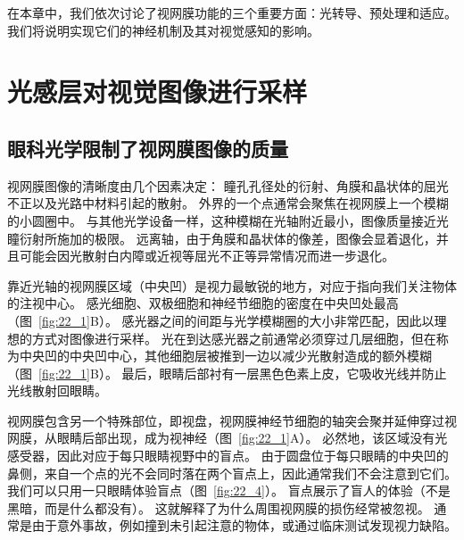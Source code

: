 在本章中，我们依次讨论了视网膜功能的三个重要方面：光转导、预处理和适应。
我们将说明实现它们的神经机制及其对视觉感知的影响。



\section{光感层对视觉图像进行采样}

\subsection{眼科光学限制了视网膜图像的质量}

视网膜图像的清晰度由几个因素决定：
瞳孔孔径处的衍射、角膜和晶状体的屈光不正以及光路中材料引起的散射。
外界的一个点通常会聚焦在视网膜上一个模糊的小圆圈中。
与其他光学设备一样，这种模糊在光轴附近最小，图像质量接近光瞳衍射所施加的极限。
远离轴，由于角膜和晶状体的像差，图像会显着退化，并且可能会因光散射白内障或近视等屈光不正等异常情况而进一步退化。


靠近光轴的视网膜区域（中央凹）是视力最敏锐的地方，对应于指向我们关注物体的注视中心。
感光细胞、双极细胞和神经节细胞的密度在中央凹处最高（图~\ref{fig:22_1}B）。
感光器之间的间距与光学模糊圈的大小非常匹配，因此以理想的方式对图像进行采样。
光在到达感光器之前通常必须穿过几层细胞，但在称为中央凹的中央凹中心，其他细胞层被推到一边以减少光散射造成的额外模糊（图~\ref{fig:22_1}B）。
最后，眼睛后部衬有一层黑色色素上皮，它吸收光线并防止光线散射回眼睛。


视网膜包含另一个特殊部位，即视盘，视网膜神经节细胞的轴突会聚并延伸穿过视网膜，从眼睛后部出现，成为视神经（图~\ref{fig:22_1}A）。
必然地，该区域没有光感受器，因此对应于每只眼睛视野中的盲点。
由于圆盘位于每只眼睛的中央凹的鼻侧，来自一个点的光不会同时落在两个盲点上，因此通常我们不会注意到它们。
我们可以只用一只眼睛体验盲点（图~\ref{fig:22_4}）。
盲点展示了盲人的体验（不是黑暗，而是什么都没有）。
这就解释了为什么周围视网膜的损伤经常被忽视。
通常是由于意外事故，例如撞到未引起注意的物体，或通过临床测试发现视力缺陷。


